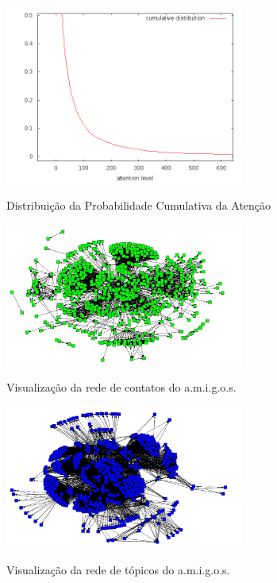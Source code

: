 \begin{figure}[h!]
  \caption{Distribuição da Probabilidade Cumulativa da Atenção}
  \centering
    \includegraphics[width=0.7\textwidth]{imgs/cdf-final.png}
    \label{ap:fig:cdf}
\end{figure}

\begin{figure}[h!]
  \caption{Visualização da rede de contatos do a.m.i.g.o.s.}
  \centering
    \includegraphics[width=0.7\textwidth]{imgs/contatos.jpg}
    \label{ap:fig:contatos}
\end{figure}

\begin{figure}[h!]
  \caption{Visualização da rede de tópicos do a.m.i.g.o.s.}
  \centering
    \includegraphics[width=0.7\textwidth]{imgs/topicos.jpg}
    \label{ap:fig:topicos}
\end{figure}


